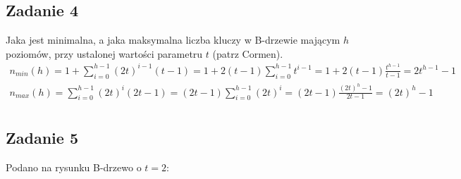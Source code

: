 \documentclass{article}
\begin{document}
\subsection*{Zadanie 4}
Jaka jest minimalna, a jaka maksymalna liczba kluczy w B-drzewie mającym $h$ poziomów, przy ustalonej wartości
parametru $t$ (patrz Cormen).
\begin{gather*}
    n_{min}(h) = 1 + \sum_{i=0}^{h-1} (2t)^{i-1}(t-1) = 1 + 2(t-1) \sum_{i=0}^{h-1} t^{i-1} = 1 + 2(t-1)
    \frac{t^{h-1}}{t-1} = 2t^{h-1} - 1 \\
    n_{max}(h) = \sum_{i=0}^{h-1} (2t)^i(2t-1) = (2t-1) \sum_{i=0}^{h-1} (2t)^i = (2t-1) \frac{(2t)^h-1}{2t-1} =
    (2t)^h-1 \\
\end{gather*}

\pagebreak
\subsection*{Zadanie 5}
Podano na rysunku B-drzewo o $t=2$:
\end{document}
